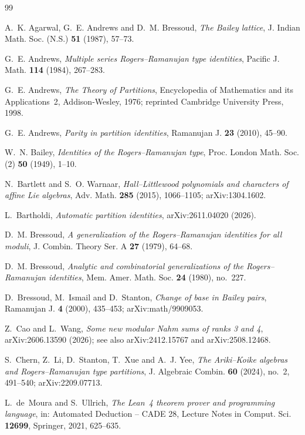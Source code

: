 \documentclass[11pt]{amsart}
\theoremstyle{definition}
\numberwithin{equation}{section}
\begin{document}
\begin{thebibliography}{99}

 A.~K. Agarwal, G.~E. Andrews and D.~M. Bressoud, \emph{The Bailey lattice}, J. Indian Math.
Soc. (N.S.) \textbf{51} (1987), 57--73.

 G.~E. Andrews, \emph{Multiple series Rogers--Ramanujan type identities}, Pacific
J. Math. \textbf{114} (1984), 267--283.

 G.~E. Andrews, \emph{The Theory of Partitions}, Encyclopedia of Mathematics and its
Applications~2, Addison-Wesley, 1976; reprinted Cambridge University Press, 1998.

 G.~E. Andrews, \emph{Parity in partition identities}, Ramanujan J. \textbf{23}
(2010), 45--90.

 W.~N. Bailey, \emph{Identities of the Rogers--Ramanujan type}, Proc. London Math. Soc.
(2) \textbf{50} (1949), 1--10.

 N.~Bartlett and S.~O. Warnaar, \emph{Hall--Littlewood polynomials and characters of affine
Lie algebras}, Adv. Math. \textbf{285} (2015), 1066--1105; arXiv:1304.1602.

 L.~Bartholdi, \emph{Automatic partition identities}, arXiv:2611.04020 (2026).

 D.~M. Bressoud, \emph{A generalization of the Rogers--Ramanujan identities for all
moduli}, J. Combin. Theory Ser. A \textbf{27} (1979), 64--68.

 D.~M. Bressoud, \emph{Analytic and combinatorial generalizations of the
Rogers--Ramanujan identities}, Mem. Amer. Math. Soc. \textbf{24} (1980), no.~227.

 D.~Bressoud, M.~Ismail and D.~Stanton, \emph{Change of base in Bailey pairs}, Ramanujan J.
\textbf{4} (2000), 435--453; arXiv:math/9909053.

 Z.~Cao and L.~Wang, \emph{Some new modular Nahm sums of ranks 3 and 4}, arXiv:2606.13590
(2026); see also arXiv:2412.15767 and arXiv:2508.12468.

 S.~Chern, Z.~Li, D.~Stanton, T.~Xue and A.~J. Yee, \emph{The Ariki--Koike algebras and
Rogers--Ramanujan type partitions}, J. Algebraic Combin. \textbf{60} (2024), no.~2, 491--540;
arXiv:2209.07713.

 L.~de~Moura and S.~Ullrich, \emph{The Lean~4 theorem prover and programming language},
in: Automated Deduction -- CADE 28, Lecture Notes in Comput. Sci. \textbf{12699}, Springer, 2021,
625--635.


\end{thebibliography}
\end{document}
